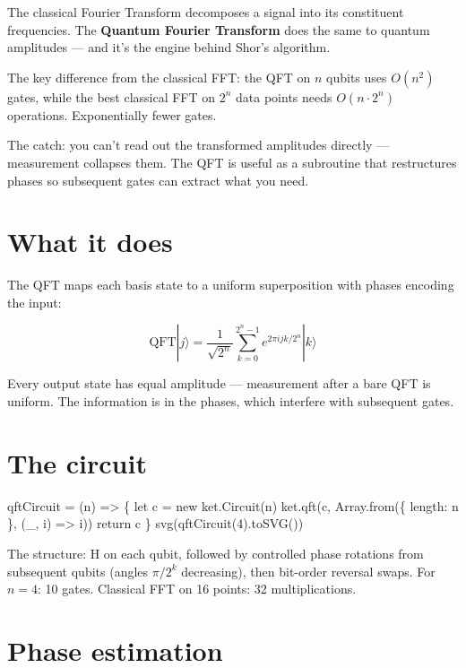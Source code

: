 \documentclass[
  11pt,
  letterpaper,
  oneside]{scrbook}
\newenvironment{Shaded}{\begin{snugshade}}{\end{snugshade}}
\newcommand{\NormalTok}[1]{\textcolor[rgb]{0.00,0.23,0.31}{#1}}
\begin{document}
The classical Fourier Transform decomposes a signal into its constituent
frequencies. The \textbf{Quantum Fourier Transform} does the same to
quantum amplitudes --- and it's the engine behind Shor's algorithm.

The key difference from the classical FFT: the QFT on \(n\) qubits uses
\(O(n^2)\) gates, while the best classical FFT on \(2^n\) data points
needs \(O(n \cdot 2^n)\) operations. Exponentially fewer gates.

The catch: you can't read out the transformed amplitudes directly ---
measurement collapses them. The QFT is useful as a subroutine that
restructures phases so subsequent gates can extract what you need.

\section{What it does}\label{what-it-does}

The QFT maps each basis state to a uniform superposition with phases
encoding the input:

\[\text{QFT}|j\rangle = \frac{1}{\sqrt{2^n}} \sum_{k=0}^{2^n-1} e^{2\pi i jk/2^n} |k\rangle\]

Every output state has equal amplitude --- measurement after a bare QFT
is uniform. The information is in the phases, which interfere with
subsequent gates.

\section{The circuit}\label{the-circuit-1}

\begin{Shaded}
\begin{Highlighting}[]
\NormalTok{qftCircuit = (n) =\textgreater{} \{}
\NormalTok{  let c = new ket.Circuit(n)}
\NormalTok{  ket.qft(c, Array.from(\{ length: n \}, (\_, i) =\textgreater{} i))}
\NormalTok{  return c}
\NormalTok{\}}
\NormalTok{svg(qftCircuit(4).toSVG())}
\end{Highlighting}
\end{Shaded}

The structure: H on each qubit, followed by controlled phase rotations
from subsequent qubits (angles \(\pi/2^k\) decreasing), then bit-order
reversal swaps. For \(n=4\): 10 gates. Classical FFT on 16 points: 32
multiplications.

\section{Phase estimation}\label{phase-estimation}
\end{document}
